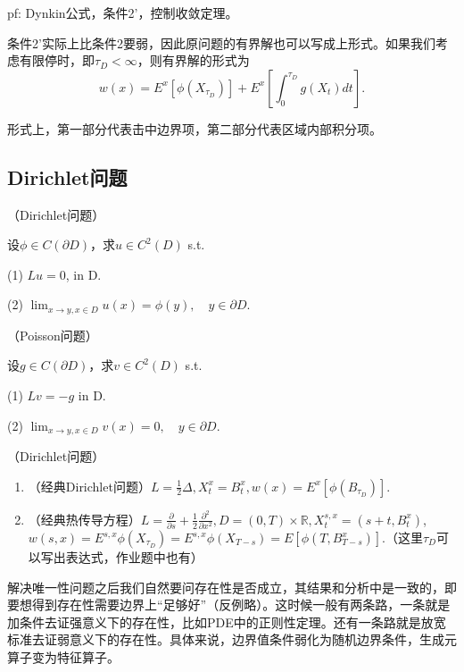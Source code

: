 pf: Dynkin公式，条件2'，控制收敛定理。

条件2'实际上比条件2要弱，因此原问题的有界解也可以写成上形式。如果我们考虑有限停时，即$\tau_D < \infty$，则有界解的形式为
\[
  w(x)=E^{x}\left[\phi\left(X_{\tau_{D}}\right)\right]+E^{x}\left[\int_{0}^{\tau_{D}} g\left(X_{t}\right) d t\right].
\]

形式上，第一部分代表击中边界项，第二部分代表区域内部积分项。

\subsection{Dirichlet问题}

\begin{df}（Dirichlet问题）
  
  设$\phi \in C(\partial D)$，求$u \in C^{2}(D)$ s.t.

  (1) $L u=0$, in D.

  (2) $\lim _{x \rightarrow y, x \in D} u(x)=\phi(y), \quad y \in \partial D$.
\end{df}

\begin{df}（Poisson问题）

  设$g \in C(\partial D)$，求$v \in C^{2}(D)$ s.t.

  (1) $L v=-g$ in D.

  (2) $\lim_{x \rightarrow y, x \in D} v(x)=0, \quad y \in \partial D .$
\end{df}

\begin{eg}（Dirichlet问题）
  \begin{enumerate}
    \item （经典Dirichlet问题）$L = \frac{1}{2}\Delta, X_t^x = B_t^x, w(x)=E^{x}\left[\phi\left(B_{\tau_{D}}\right)\right] .$
    \item （经典热传导方程）$L=\frac{\partial}{\partial s}+\frac{1}{2} \frac{\partial^{2}}{\partial x^{2}}, D = (0, T) \times \mathbb{R}, X_t^{s, x} = (s + t, B_t^x)$, $w(s, x)=E^{s, x} \phi\left(X_{\tau_{D}}\right)= E^{s, x} \phi(X_{T - s}) = E\left[\phi\left(T, B_{T - s}^{x}\right)\right]$.（这里$\tau_D$可以写出表达式，作业题中也有）
  \end{enumerate}
\end{eg}

解决唯一性问题之后我们自然要问存在性是否成立，其结果和分析中是一致的，即要想得到存在性需要边界上“足够好”（反例略）。这时候一般有两条路，一条就是加条件去证强意义下的存在性，比如PDE中的正则性定理。还有一条路就是放宽标准去证弱意义下的存在性。具体来说，边界值条件弱化为随机边界条件，生成元算子变为特征算子。

